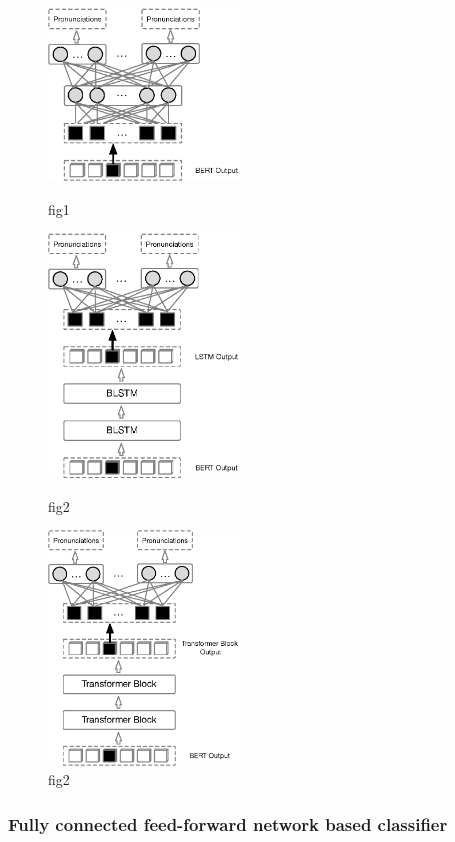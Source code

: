 \documentclass[a4paper]{article}
\begin{document}
\begin{figure}[htbp]
	\begin{minipage}[t]{0.3\linewidth}
		\centering
		\includegraphics[width=2.0in]{pics/FC2.eps}
		\caption{fig1}
		\label{fig:side:a}
	\end{minipage}%
	\begin{minipage}[t]{0.3\linewidth}
		\centering
		\includegraphics[width=2.0in]{pics/lstm2.eps}
		\caption{fig2}
	\end{minipage}
	\begin{minipage}[t]{0.3\linewidth}
		\centering
		\includegraphics[width=2.0in]{pics/sa2.eps}
		\caption{fig2}
		\label{}
	\end{minipage}
\end{figure}

\subsubsection{Fully connected feed-forward network based classifier}
\end{document}
